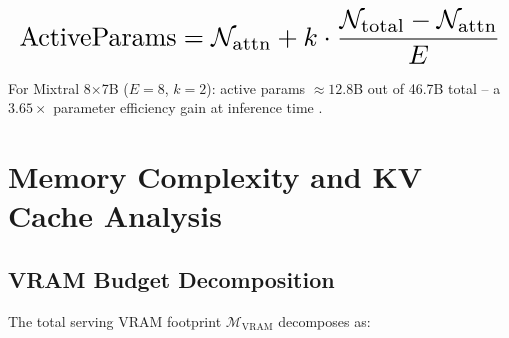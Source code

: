 \documentclass[10pt,twocolumn,letterpaper]{article}
\begin{document}
\begin{equation}
\resizebox{\columnwidth}{!}{$\displaystyle
\begin{aligned}
\text{ActiveParams} = \mathcal{N}_{\text{attn}} + k \cdot \frac{\mathcal{N}_{\text{total}} - \mathcal{N}_{\text{attn}}}{E}
\end{aligned}
$}
\end{equation}























For Mixtral 8$\times$7B ($E = 8$, $k = 2$): active params $\approx 12.8$B out of 46.7B total -- a $3.65\times$ parameter efficiency gain at inference time \cite{arxiv_2412_06333}.




\section{Memory Complexity and KV Cache Analysis}



\subsection{VRAM Budget Decomposition}


The total serving VRAM footprint $\mathcal{M}_{\text{VRAM}}$ decomposes as:
\end{document}
